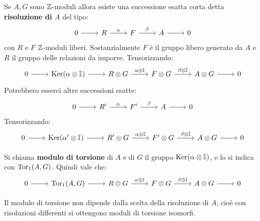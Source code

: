 \begin{definition}
  Se $ A, G $ sono $ \mathbb{Z} $-moduli allora esiste una successione esatta corta detta \textbf{risoluzione di $ A $}
  del tipo:
  \[
    \begin{tikzcd}
      0 \rar & R \rar{\alpha} & F \rar{\beta} & A \rar & 0
    \end{tikzcd}
  \]
  con $ R $ e $ F $ $ \mathbb{Z} $-moduli liberi. Sostanzialmente $ F $ è il gruppo libero generato da $ A $ e
  $ R $ il gruppo delle relazioni da imporre. Tensorizzando:
  \[
    \begin{tikzcd}
      0 \rar & \ker{\alpha \otimes \Id{}} \rar & R \otimes G \rar{\alpha \otimes \Id{}} & F \otimes G \rar{\beta \otimes \Id{}} & A \otimes G \rar & 0
    \end{tikzcd}
  \]
  Potrebbero esserci altre successioni esatte:
  \[
    \begin{tikzcd}
      0 \rar & R' \rar{\alpha} & F' \rar{\beta} & A \rar & 0
    \end{tikzcd}
  \]
  Tensorizzando:
  \[
    \begin{tikzcd}
      0 \rar & \ker{\alpha' \otimes \Id{}} \rar & R' \otimes G \rar{\alpha \otimes \Id{}} & F' \otimes G \rar{\beta \otimes \Id{}} & A \otimes G \rar & 0
    \end{tikzcd}
  \]
\end{definition}
\begin{definition}
  Si chiama \textbf{modulo di torsione} di $ A $ e di $ G $ il
  gruppo $ \mathrm{Ker}( \alpha \otimes \mathbb{I}_{}) $, e lo si indica con $ \mathrm{Tor_1}( A,G) $. Quindi vale che:
    \[
    \begin{tikzcd}
      0 \rar & \tor{A,G} \rar & R \otimes G \rar{\alpha \otimes \Id{}} & F \otimes G \rar{\beta \otimes \Id{}} & A \otimes G \rar & 0
    \end{tikzcd}
  \]
\end{definition}
\begin{lemma}
  Il modulo di torsione non dipende dalla scelta della risoluzione di $ A $, cioè con risoluzioni
  differenti si ottengono moduli di torsione isomorfi.
\end{lemma}

